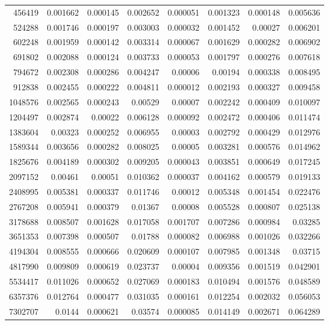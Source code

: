 \begin{tabular}{r r r r r r r r}
456419 & 0.001662 & 0.000145 & 0.002652 & 0.000051 & 0.001323 & 0.000148 & 0.005636 \\
524288 & 0.001746 & 0.000197 & 0.003003 & 0.000032 & 0.001452 & 0.00027 & 0.006201 \\
602248 & 0.001959 & 0.000142 & 0.003314 & 0.000067 & 0.001629 & 0.000282 & 0.006902 \\
691802 & 0.002088 & 0.000124 & 0.003733 & 0.000053 & 0.001797 & 0.000276 & 0.007618 \\
794672 & 0.002308 & 0.000286 & 0.004247 & 0.00006 & 0.00194 & 0.000338 & 0.008495 \\
912838 & 0.002455 & 0.000222 & 0.004811 & 0.000012 & 0.002193 & 0.000327 & 0.009458 \\
1048576 & 0.002565 & 0.000243 & 0.00529 & 0.00007 & 0.002242 & 0.000409 & 0.010097 \\
1204497 & 0.002874 & 0.00022 & 0.006128 & 0.000092 & 0.002472 & 0.000406 & 0.011474 \\
1383604 & 0.00323 & 0.000252 & 0.006955 & 0.00003 & 0.002792 & 0.000429 & 0.012976 \\
1589344 & 0.003656 & 0.000282 & 0.008025 & 0.00005 & 0.003281 & 0.000576 & 0.014962 \\
1825676 & 0.004189 & 0.000302 & 0.009205 & 0.000043 & 0.003851 & 0.000649 & 0.017245 \\
2097152 & 0.00461 & 0.00051 & 0.010362 & 0.000037 & 0.004162 & 0.000579 & 0.019133 \\
2408995 & 0.005381 & 0.000337 & 0.011746 & 0.00012 & 0.005348 & 0.001454 & 0.022476 \\
2767208 & 0.005941 & 0.000379 & 0.01367 & 0.00008 & 0.005528 & 0.000807 & 0.025138 \\
3178688 & 0.008507 & 0.001628 & 0.017058 & 0.001707 & 0.007286 & 0.000984 & 0.03285 \\
3651353 & 0.007398 & 0.000507 & 0.01788 & 0.000082 & 0.006988 & 0.001026 & 0.032266 \\
4194304 & 0.008555 & 0.000666 & 0.020609 & 0.000107 & 0.007985 & 0.001348 & 0.03715 \\
4817990 & 0.009809 & 0.000619 & 0.023737 & 0.00004 & 0.009356 & 0.001519 & 0.042901 \\
5534417 & 0.011026 & 0.000652 & 0.027069 & 0.000183 & 0.010494 & 0.001576 & 0.048589 \\
6357376 & 0.012764 & 0.000477 & 0.031035 & 0.000161 & 0.012254 & 0.002032 & 0.056053 \\
7302707 & 0.0144 & 0.000621 & 0.03574 & 0.000085 & 0.014149 & 0.002671 & 0.064289 \\

\end{tabular}
